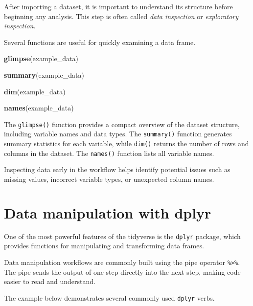 \documentclass[
  11pt,
  oneside]{book}
\newenvironment{Shaded}{\begin{snugshade}}{\end{snugshade}}
\newcommand{\FunctionTok}[1]{\textcolor[rgb]{0.13,0.29,0.53}{\textbf{#1}}}
\newcommand{\NormalTok}[1]{#1}
\begin{document}
After importing a dataset, it is important to understand its structure before beginning any analysis. This step is often called \emph{data inspection} or \emph{exploratory inspection}.

Several functions are useful for quickly examining a data frame.

\begin{Shaded}
\begin{Highlighting}[]
\FunctionTok{glimpse}\NormalTok{(example\_data)}

\FunctionTok{summary}\NormalTok{(example\_data)}

\FunctionTok{dim}\NormalTok{(example\_data)}

\FunctionTok{names}\NormalTok{(example\_data)}
\end{Highlighting}
\end{Shaded}

The \texttt{glimpse()} function provides a compact overview of the dataset structure, including variable names and data types. The \texttt{summary()} function generates summary statistics for each variable, while \texttt{dim()} returns the number of rows and columns in the dataset. The \texttt{names()} function lists all variable names.

Inspecting data early in the workflow helps identify potential issues such as missing values, incorrect variable types, or unexpected column names.

\section{Data manipulation with dplyr}\label{data-manipulation-with-dplyr}

One of the most powerful features of the tidyverse is the \texttt{dplyr} package, which provides functions for manipulating and transforming data frames.

Data manipulation workflows are commonly built using the pipe operator \texttt{\%\textgreater{}\%}. The pipe sends the output of one step directly into the next step, making code easier to read and understand.

The example below demonstrates several commonly used \texttt{dplyr} verbs.
\end{document}
